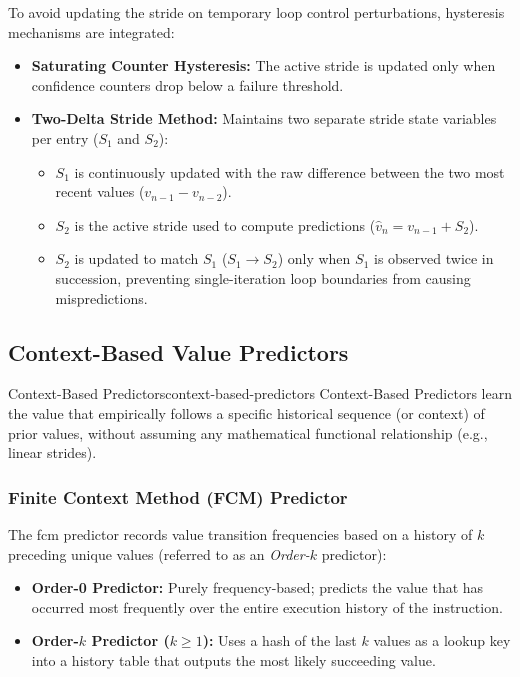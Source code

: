 To avoid updating the stride on temporary loop control perturbations, hysteresis mechanisms are integrated:
\begin{itemize}
    \item \textbf{Saturating Counter Hysteresis:} The active stride is updated only when confidence counters drop below a failure threshold.
    \item \textbf{Two-Delta Stride Method:} Maintains two separate stride state variables per entry ($S_1$ and $S_2$):
    \begin{itemize}
        \item $S_1$ is continuously updated with the raw difference between the two most recent values ($v_{n-1} - v_{n-2}$).
        \item $S_2$ is the active stride used to compute predictions ($\hat{v}_n = v_{n-1} + S_2$).
        \item $S_2$ is updated to match $S_1$ ($S_1 \to S_2$) only when $S_1$ is observed twice in succession, preventing single-iteration loop boundaries from causing mispredictions.
    \end{itemize}
\end{itemize}

\subsection{Context-Based Value Predictors}
\label{subsec:context_based_predictors}

\begin{concept}{Context-Based Predictors}{context-based-predictors}
Context-Based Predictors learn the value that empirically follows a specific historical sequence (or context) of prior values, without assuming any mathematical functional relationship (e.g., linear strides).
\end{concept}

\subsubsection{Finite Context Method (FCM) Predictor}
The \gls{fcm} predictor records value transition frequencies based on a history of $k$ preceding unique values (referred to as an \textit{Order-$k$} predictor):
\begin{itemize}
    \item \textbf{Order-0 Predictor:} Purely frequency-based; predicts the value that has occurred most frequently over the entire execution history of the instruction.
    \item \textbf{Order-$k$ Predictor ($k \ge 1$):} Uses a hash of the last $k$ values as a lookup key into a history table that outputs the most likely succeeding value.
\end{itemize}

